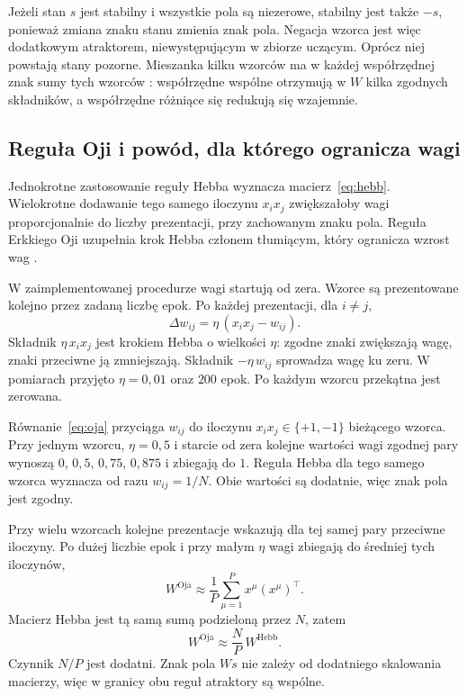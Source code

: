 \documentclass[11pt,a4paper]{article}
\begin{document}
Jeżeli stan \(s\) jest stabilny i wszystkie pola są niezerowe, stabilny jest także \(-s\), ponieważ zmiana znaku stanu zmienia znak pola. Negacja wzorca jest więc dodatkowym atraktorem, niewystępującym w zbiorze uczącym. Oprócz niej powstają stany pozorne. Mieszanka kilku wzorców ma w każdej współrzędnej znak sumy tych wzorców \cite{amit1985}: współrzędne wspólne otrzymują w \(W\) kilka zgodnych składników, a współrzędne różniące się redukują się wzajemnie.

\subsection{Reguła Oji i powód, dla którego ogranicza wagi}
Jednokrotne zastosowanie reguły Hebba wyznacza macierz~\eqref{eq:hebb}. Wielokrotne dodawanie tego samego iloczynu \(x_i x_j\) zwiększałoby wagi proporcjonalnie do liczby prezentacji, przy zachowanym znaku pola. Reguła Erkkiego Oji uzupełnia krok Hebba członem tłumiącym, który ogranicza wzrost wag \cite{oja1982}.

W zaimplementowanej procedurze wagi startują od zera. Wzorce są prezentowane kolejno przez zadaną liczbę epok. Po każdej prezentacji, dla \(i \neq j\),
\begin{equation}
\label{eq:oja}
    \Delta w_{ij} = \eta\,(x_i x_j - w_{ij}).
\end{equation}
Składnik \(\eta\, x_i x_j\) jest krokiem Hebba o wielkości \(\eta\): zgodne znaki zwiększają wagę, znaki przeciwne ją zmniejszają. Składnik \(-\eta\, w_{ij}\) sprowadza wagę ku zeru. W pomiarach przyjęto \(\eta = 0{,}01\) oraz \(200\) epok. Po każdym wzorcu przekątna jest zerowana.

Równanie~\eqref{eq:oja} przyciąga \(w_{ij}\) do iloczynu \(x_i x_j \in \{+1, -1\}\) bieżącego wzorca. Przy jednym wzorcu, \(\eta = 0{,}5\) i starcie od zera kolejne wartości wagi zgodnej pary wynoszą \(0\), \(0{,}5\), \(0{,}75\), \(0{,}875\) i zbiegają do \(1\). Reguła Hebba dla tego samego wzorca wyznacza od razu \(w_{ij} = 1/N\). Obie wartości są dodatnie, więc znak pola jest zgodny.

Przy wielu wzorcach kolejne prezentacje wskazują dla tej samej pary przeciwne iloczyny. Po dużej liczbie epok i przy małym \(\eta\) wagi zbiegają do średniej tych iloczynów,
\[
    W^{\mathrm{Oja}} \approx \frac{1}{P}\sum_{\mu=1}^{P} x^{\mu}(x^{\mu})^{\top}.
\]
Macierz Hebba jest tą samą sumą podzieloną przez \(N\), zatem
\[
    W^{\mathrm{Oja}} \approx \frac{N}{P}\, W^{\mathrm{Hebb}}.
\]
Czynnik \(N/P\) jest dodatni. Znak pola \(Ws\) nie zależy od dodatniego skalowania macierzy, więc w granicy obu reguł atraktory są wspólne.
\end{document}
